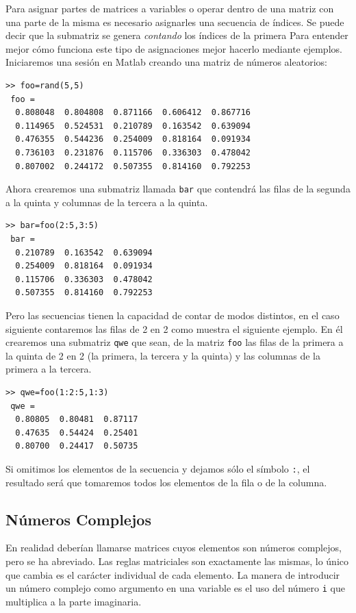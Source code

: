 Para asignar partes de matrices a variables o operar dentro de una
matriz con una parte de la misma es necesario asignarles una secuencia
de índices. Se puede decir que la submatriz se genera \emph{contando}
los índices de la primera Para entender mejor cómo funciona este tipo
de asignaciones mejor hacerlo mediante ejemplos. Iniciaremos una
sesión en Matlab creando una matriz de números aleatorios:

\begin{verbatim}
>> foo=rand(5,5)
 foo =
  0.808048  0.804808  0.871166  0.606412  0.867716
  0.114965  0.524531  0.210789  0.163542  0.639094
  0.476355  0.544236  0.254009  0.818164  0.091934
  0.736103  0.231876  0.115706  0.336303  0.478042
  0.807002  0.244172  0.507355  0.814160  0.792253
\end{verbatim}
Ahora crearemos una submatriz llamada \texttt{bar} que contendrá las
filas de la segunda a la quinta y columnas de la tercera a la quinta.

\begin{verbatim}
>> bar=foo(2:5,3:5)
 bar =
  0.210789  0.163542  0.639094
  0.254009  0.818164  0.091934
  0.115706  0.336303  0.478042
  0.507355  0.814160  0.792253
\end{verbatim}
Pero las secuencias tienen la capacidad de contar de modos distintos,
en el caso siguiente contaremos las filas de 2 en 2 como muestra el
siguiente ejemplo. En él crearemos una submatriz \texttt{qwe} que
sean, de la matriz \texttt{foo} las filas de la primera a la quinta de
2 en 2 (la primera, la tercera y la quinta) y las columnas de la
primera a la tercera.

\begin{verbatim}
>> qwe=foo(1:2:5,1:3)
 qwe =
  0.80805  0.80481  0.87117
  0.47635  0.54424  0.25401
  0.80700  0.24417  0.50735
\end{verbatim}
Si omitimos los elementos de la secuencia y dejamos sólo el símbolo
\texttt{:}, el resultado será que tomaremos todos los elementos de la
fila o de la columna.

\subsection{Números Complejos }

En realidad deberían llamarse matrices cuyos elementos son números
complejos, pero se ha abreviado. Las reglas matriciales son
exactamente las mismas, lo único que cambia es el carácter individual
de cada elemento. La manera de introducir un número complejo como
argumento en una variable es el uso del número \texttt{i} que
multiplica a la parte imaginaria.

